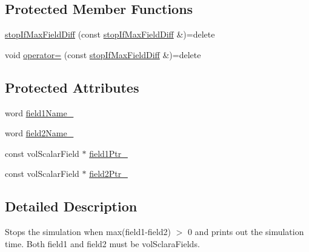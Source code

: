 \subsection*{Protected Member Functions}
\begin{DoxyCompactItemize}
\item 
\hyperlink{classFoam_1_1functionObjects_1_1stopIfMaxFieldDiff_a9339f7600f7c1bb750f55d22cd160381}{stop\+If\+Max\+Field\+Diff} (const \hyperlink{classFoam_1_1functionObjects_1_1stopIfMaxFieldDiff}{stop\+If\+Max\+Field\+Diff} \&)=delete
\item 
void \hyperlink{classFoam_1_1functionObjects_1_1stopIfMaxFieldDiff_ae5128d9edf834d60ec8904096cde9261}{operator=} (const \hyperlink{classFoam_1_1functionObjects_1_1stopIfMaxFieldDiff}{stop\+If\+Max\+Field\+Diff} \&)=delete
\end{DoxyCompactItemize}
\subsection*{Protected Attributes}
\begin{DoxyCompactItemize}
\item 
word \hyperlink{classFoam_1_1functionObjects_1_1stopIfMaxFieldDiff_acb0f79711fb8fa411eb60ad488a7e0f1}{field1\+Name\+\_\+}
\item 
word \hyperlink{classFoam_1_1functionObjects_1_1stopIfMaxFieldDiff_a7562a744a11124653e3eacf0b293ce8b}{field2\+Name\+\_\+}
\item 
const vol\+Scalar\+Field $\ast$ \hyperlink{classFoam_1_1functionObjects_1_1stopIfMaxFieldDiff_a640e57e34f7ff15738b26b557bca5458}{field1\+Ptr\+\_\+}
\item 
const vol\+Scalar\+Field $\ast$ \hyperlink{classFoam_1_1functionObjects_1_1stopIfMaxFieldDiff_a1ec19f0ee9cf9323c9e23527eb12e51c}{field2\+Ptr\+\_\+}
\end{DoxyCompactItemize}


\subsection{Detailed Description}
Stops the simulation when max(field1-\/field2) $>$ 0 and prints out the simulation time. Both field1 and field2 must be vol\+Sclara\+Fields. 

